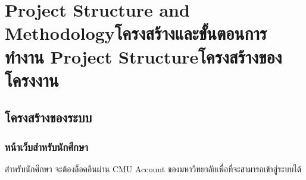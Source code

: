 \chapter{\ifproject%
\ifenglish Project Structure and Methodology\else โครงสร้างและขั้นตอนการทำงาน\fi
\else%
\ifenglish Project Structure\else โครงสร้างของโครงงาน\fi
\fi
}

\makeatletter


\makeatother

\section{โครงสร้างของระบบ}
\subsection{หน้าเว็บสำหรับนักศึกษา}
\begin{center}
สำหรับนักศึกษา จะต้องล็อคอินผ่าน CMU Account ของมหาวิทยาลัยเพื่อที่จะสามารถเข้าสู่ระบบได้
\end{center}

